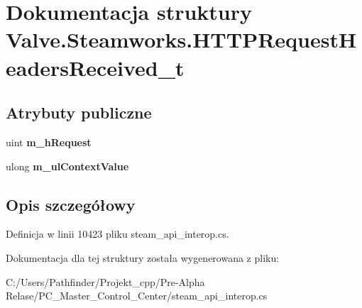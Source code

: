 \hypertarget{struct_valve_1_1_steamworks_1_1_h_t_t_p_request_headers_received__t}{}\section{Dokumentacja struktury Valve.\+Steamworks.\+H\+T\+T\+P\+Request\+Headers\+Received\+\_\+t}
\label{struct_valve_1_1_steamworks_1_1_h_t_t_p_request_headers_received__t}
\subsection*{Atrybuty publiczne}
\begin{DoxyCompactItemize}
\item 
\mbox{\label{struct_valve_1_1_steamworks_1_1_h_t_t_p_request_headers_received__t_ae0d65ac06c6a1981f5e9fb889b810ff7}} 
uint {\bfseries m\+\_\+h\+Request}
\item 
\mbox{\label{struct_valve_1_1_steamworks_1_1_h_t_t_p_request_headers_received__t_a1004b418481d354011f7c31b116d2894}} 
ulong {\bfseries m\+\_\+ul\+Context\+Value}
\end{DoxyCompactItemize}


\subsection{Opis szczegółowy}


Definicja w linii 10423 pliku steam\+\_\+api\+\_\+interop.\+cs.



Dokumentacja dla tej struktury została wygenerowana z pliku\+:\begin{DoxyCompactItemize}
\item 
C\+:/\+Users/\+Pathfinder/\+Projekt\+\_\+cpp/\+Pre-\/\+Alpha Relase/\+P\+C\+\_\+\+Master\+\_\+\+Control\+\_\+\+Center/steam\+\_\+api\+\_\+interop.\+cs\end{DoxyCompactItemize}
